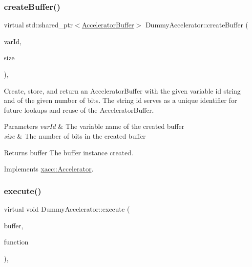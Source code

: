\subsubsection{\texorpdfstring{create\+Buffer()}{createBuffer()}}
{\footnotesize\ttfamily virtual std\+::shared\+\_\+ptr$<$\hyperlink{a01447}{Accelerator\+Buffer}$>$ Dummy\+Accelerator\+::create\+Buffer (\begin{DoxyParamCaption}\item[{const std\+::string \&}]{var\+Id,  }\item[{const int}]{size }\end{DoxyParamCaption})\hspace{0.3cm}{\ttfamily [inline]}, {\ttfamily [virtual]}}

Create, store, and return an Accelerator\+Buffer with the given variable id string and of the given number of bits. The string id serves as a unique identifier for future lookups and reuse of the Accelerator\+Buffer.


\begin{DoxyParams}{Parameters}
{\em var\+Id} & The variable name of the created buffer \\
\hline
{\em size} & The number of bits in the created buffer \\
\hline
\end{DoxyParams}
\begin{DoxyReturn}{Returns}
buffer The buffer instance created. 
\end{DoxyReturn}


Implements \hyperlink{a01435_a064a2dbd58338364115c260267806945}{xacc\+::\+Accelerator}.

\mbox{\label{a01143_a389ba22af5d0d964f5d5367f01712b3c}} 
\subsubsection{\texorpdfstring{execute()}{execute()}}
{\footnotesize\ttfamily virtual void Dummy\+Accelerator\+::execute (\begin{DoxyParamCaption}\item[{std\+::shared\+\_\+ptr$<$ \hyperlink{a01447}{Accelerator\+Buffer} $>$}]{buffer,  }\item[{const std\+::shared\+\_\+ptr$<$ \hyperlink{a01475}{Function} $>$}]{function }\end{DoxyParamCaption})\hspace{0.3cm}{\ttfamily [inline]}, {\ttfamily [virtual]}}

